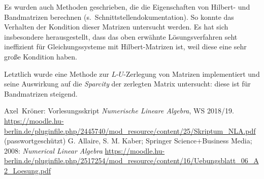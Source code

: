 \documentclass[smallheadings]{scrartcl}
\numberwithin{equation}{section}
\begin{document}
Es wurden auch Methoden geschrieben, die die  Eigenschaften von Hilbert- und Bandmatrizen berechnen (s.~Schnittstellendokumentation). So konnte das Verhalten der Kondition dieser Matrizen untersucht werden. Es hat sich insbesondere herausgestellt, dass das oben erwähnte Lösungsverfahren seht ineffizient für Gleichungssysteme mit Hilbert-Matrizen ist, weil diese eine sehr große Kondition haben.

Letztlich wurde eine Methode zur $L$-$U$-Zerlegung von Matrizen implementiert und seine Auswirkung auf die \textit{Sparcity} der zerlegten Matrix untersucht: diese ist für Bandmatrizen steigend.


\begin{thebibliography}{9}
 Axel~Kröner: Vorlesungsskript \textit{Numerische Lineare Algebra}, WS 2018/19. 
\url{https://moodle.hu-berlin.de/pluginfile.php/2445740/mod_resource/content/25/Skriptum_NLA.pdf} (passwortgeschützt)
 G. Allaire, S. M. Kaber; Springer Science+Business Media; 2008: \textit{Numerical Linear Algebra}
\url{https://moodle.hu-berlin.de/pluginfile.php/2517254/mod_resource/content/16/Uebungsblatt_06_A2_Loesung.pdf}
\end{thebibliography}


\end{document}
